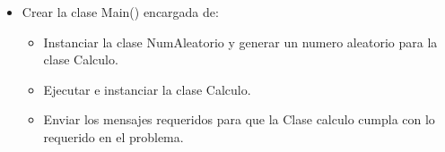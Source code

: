 \documentclass{exam}
\begin{document}
\begin{questions}
\begin{enumerate}
\begin{itemize}
\begin{itemize}
    \end{itemize}
    \item Crear la clase Main() encargada de:
      \begin{itemize}
        \item Instanciar la clase NumAleatorio y generar un numero aleatorio para la clase Calculo.
        \item Ejecutar e instanciar la clase Calculo.
        \item Enviar los mensajes requeridos para que la Clase calculo cumpla con lo requerido en el problema.
      \end{itemize}

  \end{itemize}
  \end{enumerate}

\end{questions}
\end{document}
